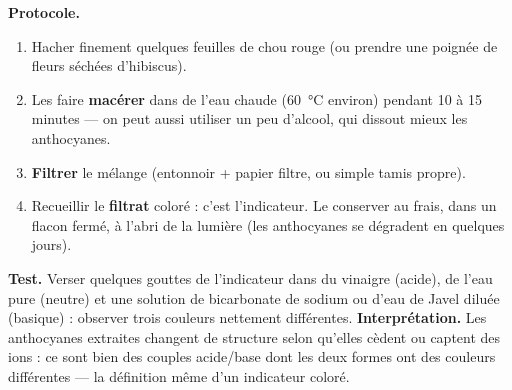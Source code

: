 \documentclass[11pt]{article}
\begin{document}
\begin{experience}
\textbf{Protocole.}
\begin{enumerate}
\item Hacher finement quelques feuilles de chou rouge (ou prendre une poignée de fleurs séchées d'hibiscus).
\item Les faire \textbf{macérer} dans de l'eau chaude (\SI{60}{\celsius} environ) pendant 10 à 15 minutes — on peut aussi utiliser un peu d'alcool, qui dissout mieux les anthocyanes.
\item \textbf{Filtrer} le mélange (entonnoir + papier filtre, ou simple tamis propre).
\item Recueillir le \textbf{filtrat} coloré : c'est l'indicateur. Le conserver au frais, dans un flacon fermé, à l'abri de la lumière (les anthocyanes se dégradent en quelques jours).
\end{enumerate}
\textbf{Test.} Verser quelques gouttes de l'indicateur dans du vinaigre (acide), de l'eau pure (neutre) et une solution de bicarbonate de sodium ou d'eau de Javel diluée (basique) : observer trois couleurs nettement différentes.
\textbf{Interprétation.} Les anthocyanes extraites changent de structure selon qu'elles cèdent ou captent des ions  : ce sont bien des couples acide/base dont les deux formes ont des couleurs différentes — la définition même d'un indicateur coloré.
\end{experience}
\end{document}
